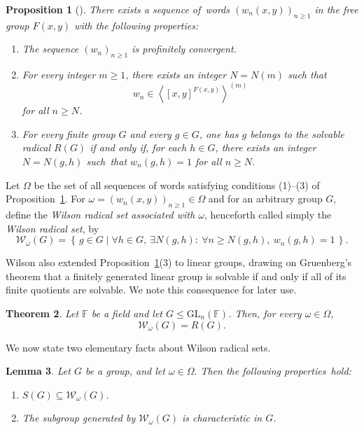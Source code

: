\documentclass[11pt, reqno]{amsart}
\numberwithin{equation}{section}
\newtheorem{theorem}{Theorem}[section]
\newtheorem{lemma}[theorem]{Lemma}
\newtheorem{proposition}[theorem]{Proposition}
\theoremstyle{definition}
\numberwithin{equation}{section}
\begin{document}
\begin{proposition}[{\cite[Eq.~(2) and Theorem]{Wilson2011}}]
\label{prop:Wilson-sequence}
There exists a sequence of~words $(w_n(x,y))_{n\geq 1}$ in the free group $F(x,y)$ with the following properties:
\begin{enumerate}[label=\textup{(\arabic*)}]
    \item The sequence $(w_n)_{n\geq 1}$ is profinitely convergent.
    \item For every integer $m\geq 1$, there exists an integer $N=N(m)$ such that
          $$w_n\in \left\langle [x,y]^{F(x,y)}\right\rangle^{(m)}$$ 
          for all $n\geq N$.
    \item For every finite group $G$ and every $g\in G$, one has $g$ belongs to the solvable radical $R(G)$ if and only if, for each $h\in G$, there exists an integer
          $N=N(g,h)$ such~that $w_n(g,h)=1$ for all $n\geq N$.
\end{enumerate}
\end{proposition}
  
Let $\Omega$ be the set of all sequences of words satisfying conditions \textup{(1)}--\textup{(3)} of Proposition~\ref{prop:Wilson-sequence}.  
For $\omega=(w_n(x,y))_{n\geq 1}\in\Omega$ and for an arbitrary group $G$, define the \emph{Wilson radical set associated with $\omega$}, henceforth
called simply the \emph{Wilson radical set}, by 
$$\mathcal W_\omega(G)=\left\{\,g\in G \mid \forall h\in G,\ \exists N(g,h):\ \forall n\geq N(g,h),\ w_n(g,h)=1 \,\right\}.$$

Wilson also extended Proposition~\ref{prop:Wilson-sequence}(3) to linear groups, drawing on Gruenberg's theorem \cite[Theorem~2]{Gruenberg66} that a finitely generated linear group is solvable if and only if all of its finite quotients are solvable.  We note this consequence for later use.

\begin{theorem}
\label{theo:Wilsonradsetlineargroup}
Let $\mathbb F$ be a field and let $G\leq \mathrm{GL}_n(\mathbb F)$.  Then, for every $\omega\in\Omega$,
$$\mathcal W_\omega(G)=R(G).$$
\end{theorem}

We now state two elementary facts about Wilson radical sets.

\begin{lemma}\label{lem:SsubseteqW}
Let $G$ be a group, and let $\omega\in\Omega.$ Then the following properties~hold:
\begin{enumerate}[label=\textup{(\arabic*)}]
    \item $S(G) \subseteq \mathcal{W}_{\omega}(G)$.
    \item The subgroup generated by $ \mathcal{W}_{\omega}(G)$ is characteristic in $G$.
\end{enumerate}
\end{lemma}
    
\end{document}
